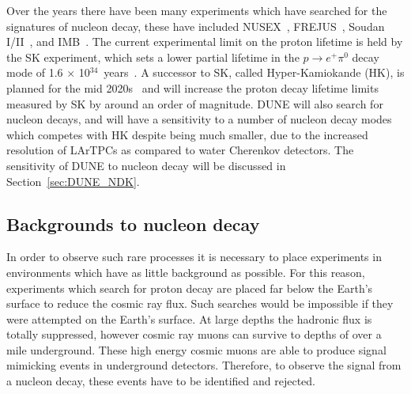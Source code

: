 Over the years there have been many experiments which have searched for the signatures of nucleon decay, these have included NUSEX~\citep{BATTISTONI1983454}, FREJUS~\citep{berger:in2p3-00015565}, Soudan I/II~\citep{SoudanLim}, and IMB~\citep{Gajewski:1989gh}. The current experimental limit on the proton lifetime is held by the SK experiment, which sets a lower partial lifetime in the $p\ensuremath{\rightarrow}{e}^{+}{\ensuremath{\pi}}^{0}$ decay mode of 1.6 $\times$ 10$^{34}$~years~\citep{PhysRevD.95.012004}. A successor to SK, called Hyper-Kamiokande (HK), is planned for the mid 2020s~\citep{Abe:2011ts} and will increase the proton decay lifetime limits measured by SK by around an order of magnitude. DUNE will also search for nucleon decays, and will have a sensitivity to a number of nucleon decay modes which competes with HK despite being much smaller, due to the increased resolution of LArTPCs as compared to water Cherenkov detectors. The sensitivity of DUNE to nucleon decay will be discussed in Section~\ref{sec:DUNE_NDK}. \\  

\subsection{Backgrounds to nucleon decay} \label{sec:BkNDK}  %
In order to observe such rare processes it is necessary to place experiments in environments which have as little background as possible. For this reason, experiments which search for proton decay are placed far below the Earth's surface to reduce the cosmic ray flux. Such searches would be impossible if they were attempted on the Earth's surface. At large depths the hadronic flux is totally suppressed, however cosmic ray muons can survive to depths of over a mile underground. These high energy cosmic muons are able to produce signal mimicking events in underground detectors. Therefore, to observe the signal from a nucleon decay, these events have to be identified and rejected. \\

